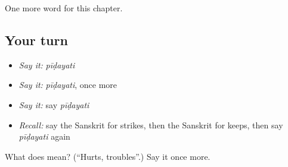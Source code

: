 \begin{grammarlens}[title={What you've built}]
One more word for this chapter.
\end{grammarlens}

\subsection*{Your turn}
\begin{itemize}
\raggedright
  \item \emph{Say it:} \emph{pīḍayati}
  \item \emph{Say it:} \emph{pīḍayati}, once more
  \item \emph{Say it:} say \emph{pīḍayati}
  \item \emph{Recall:} say the Sanskrit for strikes, then the Sanskrit for keeps, then say \emph{pīḍayati} again
\end{itemize}

\begin{tcolorbox}[breakable,colback=teal!4,colframe=teal!35!black,title={Before you move on}]
What does  mean? (\textquotedblleft{}Hurts, troubles\textquotedblright{}.) Say it once more.
\end{tcolorbox}
